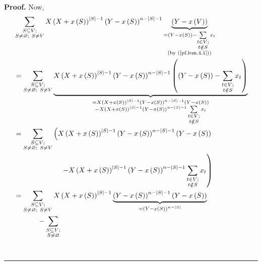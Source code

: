 \documentclass[numbers=enddot,12pt,final,onecolumn,notitlepage]{scrartcl}%
\theoremstyle{definition}
\newenvironment{proof}[1][Proof]{\noindent\textbf{#1.} }{\ \rule{0.5em}{0.5em}}
\let\sumnonlimits\sum
\renewcommand{\sum}{\sumnonlimits\limits}
\newenvironment{verlong}{}{}
\begin{document}
\begin{verlong}
\begin{proof}
Now,%
\begin{align*}
&  \sum_{\substack{S\subseteq V;\\S\neq\varnothing;\ S\neq V}}X\left(
X+x\left(  S\right)  \right)  ^{\left\vert S\right\vert -1}\left(  Y-x\left(
S\right)  \right)  ^{n-\left\vert S\right\vert -1}\underbrace{\left(
Y-x\left(  V\right)  \right)  }_{\substack{=\left(  Y-x\left(  S\right)
\right)  -\sum_{\substack{t\in V;\\t\notin S}}x_{t}\\\text{(by
(\ref{pf.lem.4.1}))}}}\\
&  =\sum_{\substack{S\subseteq V;\\S\neq\varnothing;\ S\neq V}%
}\underbrace{X\left(  X+x\left(  S\right)  \right)  ^{\left\vert S\right\vert
-1}\left(  Y-x\left(  S\right)  \right)  ^{n-\left\vert S\right\vert
-1}\left(  \left(  Y-x\left(  S\right)  \right)  -\sum_{\substack{t\in
V;\\t\notin S}}x_{t}\right)  }_{\substack{=X\left(  X+x\left(  S\right)
\right)  ^{\left\vert S\right\vert -1}\left(  Y-x\left(  S\right)  \right)
^{n-\left\vert S\right\vert -1}\left(  Y-x\left(  S\right)  \right)
\\-X\left(  X+x\left(  S\right)  \right)  ^{\left\vert S\right\vert -1}\left(
Y-x\left(  S\right)  \right)  ^{n-\left\vert S\right\vert -1}\sum
_{\substack{t\in V;\\t\notin S}}x_{t}}}\\
&  =\sum_{\substack{S\subseteq V;\\S\neq\varnothing;\ S\neq V}}\left(
X\left(  X+x\left(  S\right)  \right)  ^{\left\vert S\right\vert -1}\left(
Y-x\left(  S\right)  \right)  ^{n-\left\vert S\right\vert -1}\left(
Y-x\left(  S\right)  \right)  \right. \\
&  \ \ \ \ \ \ \ \ \ \ \ \ \ \ \ \ \ \ \ \ \left.  -X\left(  X+x\left(
S\right)  \right)  ^{\left\vert S\right\vert -1}\left(  Y-x\left(  S\right)
\right)  ^{n-\left\vert S\right\vert -1}\sum_{\substack{t\in V;\\t\notin
S}}x_{t}\right) \\
&  =\sum_{\substack{S\subseteq V;\\S\neq\varnothing;\ S\neq V}}X\left(
X+x\left(  S\right)  \right)  ^{\left\vert S\right\vert -1}\underbrace{\left(
Y-x\left(  S\right)  \right)  ^{n-\left\vert S\right\vert -1}\left(
Y-x\left(  S\right)  \right)  }_{=\left(  Y-x\left(  S\right)  \right)
^{n-\left\vert S\right\vert }}\\
&  \ \ \ \ \ \ \ \ \ \ -\sum_{\substack{S\subseteq V;\\S\neq\varnothing
}}
\end{align*}
\end{proof}
\end{verlong}
\end{document}
